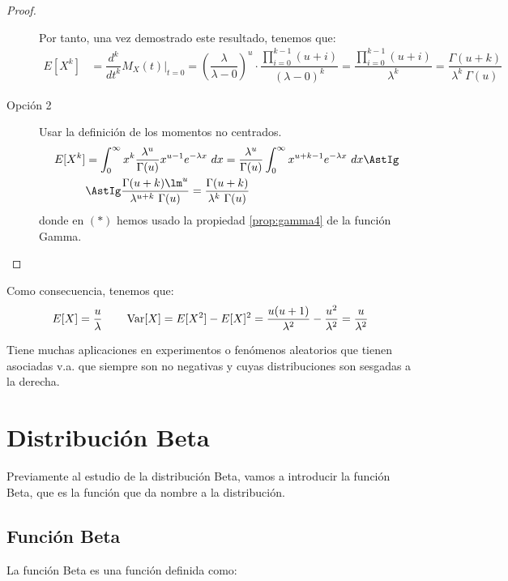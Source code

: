\begin{proof}
\begin{description}
        Por tanto, una vez demostrado este resultado, tenemos que:
        \begin{align*}
            E[X^k] &= \dfrac{d^k}{dt^k} M_X(t) \Big|_{t=0}
            = \left(\dfrac{\lambda}{\lambda-0}\right)^u \cdot \dfrac{\prod\limits_{i=0}^{k-1}(u+i)}{(\lambda-0)^k}
            = \dfrac{\prod\limits_{i=0}^{k-1}(u+i)}{\lambda^k} = \dfrac{\Gamma(u+k)}{\lambda^k~\Gamma(u)}
        \end{align*}

        \item[Opción 2] Usar la definición de los momentos no centrados.
        \begin{align*}
            E[X^k] &= \int_{0}^{\infty} x^k \dfrac{\lambda^u}{\Gamma(u)}x^{u-1}e^{-\lambda x}~dx
            = \dfrac{\lambda^u}{\Gamma(u)} \int_{0}^{\infty} x^{u+k-1}e^{-\lambda x}~dx
            \AstIg \\ &\AstIg \dfrac{\Gamma(u+k)\lm^u}{\lambda^{u+k}~\Gamma(u)}
            = \dfrac{\Gamma(u+k)}{\lambda^k~\Gamma(u)}
        \end{align*}
        donde en $(\ast)$ hemos usado la propiedad \ref{prop:gamma4} de la función Gamma.
    \end{description}
\end{proof}

Como consecuencia, tenemos que:
\begin{equation*}
    E[X] = \dfrac{u}{\lambda} \qquad
    \operatorname{Var}[X] = E[X^2] - E[X]^2 = \dfrac{u(u+1)}{\lambda^2} - \dfrac{u^2}{\lambda^2} = \dfrac{u}{\lambda^2}
\end{equation*}


Tiene muchas aplicaciones en experimentos o fenómenos aleatorios que tienen asociadas v.a. que siempre son no negativas
y cuyas distribuciones son sesgadas a la derecha.


\section{Distribución Beta}

Previamente al estudio de la distribución Beta, vamos a introducir la función Beta, que es la función que da nombre a la distribución.

\subsection{Función Beta}

\begin{definicion}
    La función Beta es una función definida como:
\end{definicion}

